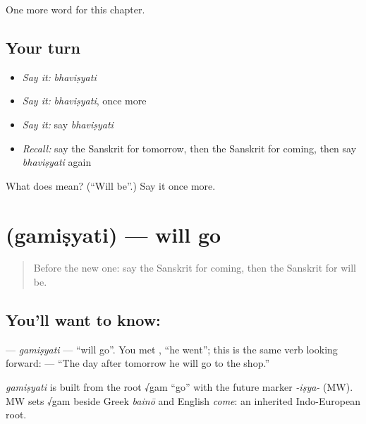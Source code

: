 \begin{grammarlens}[title={What you've built}]
One more word for this chapter.
\end{grammarlens}

\subsection*{Your turn}
\begin{itemize}
\raggedright
  \item \emph{Say it:} \emph{bhaviṣyati}
  \item \emph{Say it:} \emph{bhaviṣyati}, once more
  \item \emph{Say it:} say \emph{bhaviṣyati}
  \item \emph{Recall:} say the Sanskrit for tomorrow, then the Sanskrit for coming, then say \emph{bhaviṣyati} again
\end{itemize}

\begin{tcolorbox}[breakable,colback=teal!4,colframe=teal!35!black,title={Before you move on}]
What does  mean? (\textquotedblleft{}Will be\textquotedblright{}.) Say it once more.
\end{tcolorbox}
\section[\texorpdfstring{\sk{गमिष्यति} (gamiṣyati)}{गमिष्यति (gamiṣyati)}]{ (gamiṣyati) — will go}

\label{lesson:SA-C139-gamisyati}



\begin{quote}
Before the new one: say the Sanskrit for coming, then the Sanskrit for will be.
\end{quote}

\subsection*{You'll want to know: }
\textbf{} — \emph{gamiṣyati} — \textquotedblleft{}will go\textquotedblright{}. You met \textbf{}, \textquotedblleft{}he went\textquotedblright{}; this is the same verb looking forward: \textbf{   } — \textquotedblleft{}The day after tomorrow he will go to the shop.\textquotedblright{}

\begin{cousinweb}
\emph{gamiṣyati} is built from the root √gam \textquotedblleft{}go\textquotedblright{} with the future marker \emph{-iṣya-} (MW). MW sets √gam beside Greek \emph{bainō} and English \emph{come}: an inherited Indo-European root.
\end{cousinweb}

